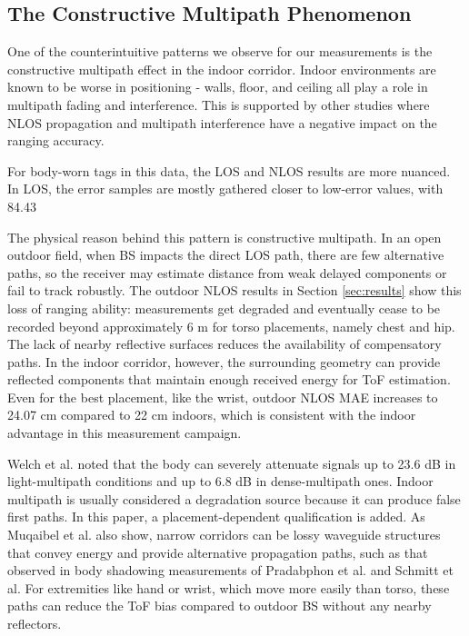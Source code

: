 \subsection{The Constructive Multipath Phenomenon}

One of the counterintuitive patterns we observe for our measurements is the constructive multipath effect in the indoor corridor. Indoor environments are known to be worse in positioning - walls, floor, and ceiling all play a role in multipath fading and interference. This is supported by other studies where NLOS propagation and multipath interference have a negative impact on the ranging accuracy.

For body-worn tags in this data, the LOS and NLOS results are more nuanced. In LOS, the error samples are mostly gathered closer to low-error values, with 84.43%

The physical reason behind this pattern is constructive multipath. In an open outdoor field, when BS impacts the direct LOS path, there are few alternative paths, so the receiver may estimate distance from weak delayed components or fail to track robustly. The outdoor NLOS results in Section \ref{sec:results} show this loss of ranging ability: measurements get degraded and eventually cease to be recorded beyond approximately 6 m for torso placements, namely chest and hip. The lack of nearby reflective surfaces reduces the availability of compensatory paths. In the indoor corridor, however, the surrounding geometry can provide reflected components that maintain enough received energy for ToF estimation. Even for the best placement, like the wrist, outdoor NLOS MAE increases to 24.07 cm compared to 22 cm indoors, which is consistent with the indoor advantage in this measurement campaign.

Welch et al. noted that the body can severely attenuate signals up to 23.6 dB in light-multipath conditions and up to 6.8 dB in dense-multipath ones. Indoor multipath is usually considered a degradation source because it can produce false first paths. In this paper, a placement-dependent qualification is added. As Muqaibel et al. also show, narrow corridors can be lossy waveguide structures that convey energy and provide alternative propagation paths, such as that observed in body shadowing measurements of Pradabphon et al. and Schmitt et al. For extremities like hand or wrist, which move more easily than torso, these paths can reduce the ToF bias compared to outdoor BS without any nearby reflectors.

